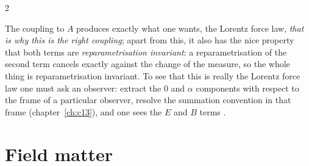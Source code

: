 \begin{paracol}{2}
\begin{coursenote}
\end{coursenote}
The coupling to $A$ produces exactly what one wants, the Lorentz force law, \emph{that is why this is the right coupling}; apart from this, it also has the nice property that both terms are \emph{reparametrisation invariant}: a reparametrisation of the second term cancels exactly against the change of the measure, so the whole thing is reparametrisation invariant. To see that this is really the Lorentz force law one must ask an observer: extract the $0$ and $\alpha$ components with respect to the frame of a particular observer, resolve the summation convention in that frame (chapter~\ref{ch:c13}), and one sees the $E$ and $B$ terms .

\section{Field matter}\label{sec:c14-field}


\end{paracol}
